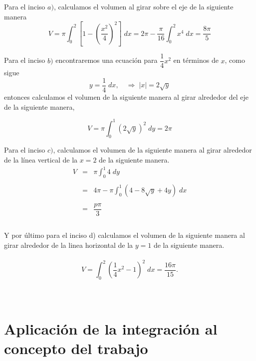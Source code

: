 \begin{enumerate}[ \bfseries 1.]
	Para el inciso $a)$, calculamos el volumen al girar sobre el eje de la siguiente manera
	$$V=\pi\int_0^2 \left[1-\left(\dfrac{x^2}{4}\right)^2\right]\; dx = 2\pi-\dfrac{\pi}{16}\int_0^2 x^4 \; dx = \dfrac{8\pi}{5}$$

	Para el inciso $b)$ encontraremos una ecuación para $\dfrac{1}{4}x^2$ en términos de $x$, como sigue
	$$y=\dfrac{1}{4}\; dx,\quad \Longrightarrow \; |x|=2\sqrt{y}$$
	entonces calculamos el volumen de la siguiente manera al girar alrededor del eje de la siguiente manera,

	$$V = \pi\int_0^1 (2\sqrt{y})^2\; dy = 2\pi$$

	Para el inciso $c)$, calculamos el volumen de la siguiente manera al girar alrededor de la línea vertical de la $x=2$ de la siguiente manera.
	$$\begin{array}{rcl}
	    V &=& \pi\displaystyle\int_0^1 4 \;dy \\\\
	    &=&4\pi -\pi\displaystyle\int_0^1 (4-8\sqrt{y}+4y)\; dx\\\\
	    &=&\dfrac{p\pi}{3}\\\\
	\end{array}$$

	Y por último para el inciso d) calculamos el volumen de la siguiente manera al girar alrededor de la linea horizontal de la $y=1$ de la siguiente manera.\\\\
	$$V=\int_0^2\left(\dfrac{1}{4}x^2 - 1\right)^2 \; dx = \dfrac{16\pi}{15}.$$\\\\

\end{enumerate}


\section{Aplicación de la integración al concepto del trabajo}

